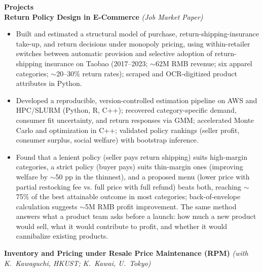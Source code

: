 ﻿\documentclass[11pt,letterpaper]{article}
\begin{document}
{\large \textbf{Projects}}\\[-0.5pt]
\textbf{Return Policy Design in E-Commerce} \textit{(Job Market Paper)}\\
\vspace{-6pt}
\begin{itemize}
  \item Built and estimated a structural model of purchase, return-shipping-insurance take-up, and return decisions under monopoly pricing, using within-retailer switches between automatic provision and selective adoption of return-shipping insurance on Taobao (2017--2023; $\sim$62M RMB revenue; six apparel categories; $\sim$20--30\% return rates); scraped and OCR-digitized product attributes in Python.
  \item Developed a reproducible, version-controlled estimation pipeline on AWS and HPC/SLURM (Python, R, C++); recovered category-specific demand, consumer fit uncertainty, and return responses via GMM; accelerated Monte Carlo and optimization in C++; validated policy rankings (seller profit, consumer surplus, social welfare) with bootstrap inference.
  \item Found that a lenient policy (seller pays return shipping) suits high-margin categories, a strict policy (buyer pays) suits thin-margin ones (improving welfare by $\sim$50 pp in the thinnest), and a proposed menu (lower price with partial restocking fee vs. full price with full refund) beats both, reaching $\sim$75\% of the best attainable outcome in most categories; back-of-envelope calculation suggests $\sim$5M RMB profit improvement. The same method answers what a product team asks before a launch: how much a new product would sell, what it would contribute to profit, and whether it would cannibalize existing products.
\end{itemize}
\vspace{-3pt}
\textbf{Inventory and Pricing under Resale Price Maintenance (RPM)} \textit{(with K.\ Kawaguchi, HKUST; K.\ Kawai, U.\ Tokyo)}\\
\vspace{-6pt}
\end{document}
